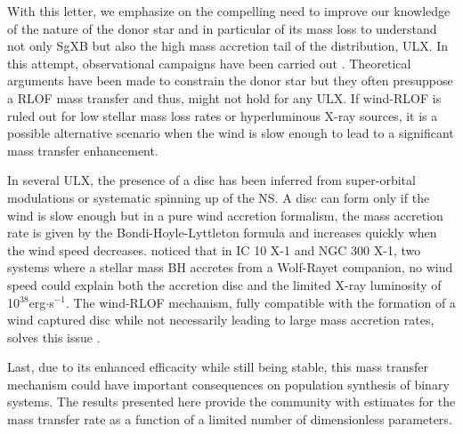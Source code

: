 \documentclass[letter]{aa}
\makeatletter
\newcommand{\sgx}{SgXB\xspace}
\newcommand{\ulx}{ULX\xspace}
\newcommand*{\rlof}{RLOF\@\xspace}
\newcommand*{\ns}{NS\@\xspace}
\newcommand*{\bh}{BH\@\xspace}
\newcommand*{\eg}{e.g.\@\xspace}
\newcommand*{\ie}{i.e.\@\xspace}
\makeatother
\begin{document}
With this letter, we emphasize on the compelling need to improve our knowledge of the nature of the donor star and in particular of its mass loss to understand not only \sgx but also the high mass accretion tail of the distribution, \ulx. In this attempt, observational campaigns have been carried out \cite[see \eg][]{Heida2014}. Theoretical arguments have been made to constrain the donor star but they often presuppose a \rlof mass transfer and thus, might not hold for any \ulx \citep{Karino2017}. If wind-\rlof is ruled out for low stellar mass loss rates or hyperluminous X-ray sources, it is a possible alternative scenario when the wind is slow enough to lead to a significant mass transfer enhancement. 

In several \ulx, the presence of a disc has been inferred from super-orbital modulations or systematic spinning up of the \ns \citep[\eg in P13,][]{Fuerst2018}. A disc can form only if the wind is slow enough \citep{Illarionov1975} but in a pure wind accretion formalism, the mass accretion rate is given by the Bondi-Hoyle-Lyttleton formula and increases quickly when the wind speed decreases. \cite{Tutukov2016} noticed that in IC 10 X-1 and NGC 300 X-1, two systems where a stellar mass \bh accretes from a Wolf-Rayet companion, no wind speed could explain both the accretion disc and the limited X-ray luminosity of 10$^{38}$erg$\cdot$s$^{-1}$. The wind-\rlof mechanism, fully compatible with the formation of a wind captured disc while not necessarily leading to large mass accretion rates, solves this issue \citep{ElMellah2018}. 

Last, due to its enhanced efficacity while still being stable, this mass transfer mechanism could have important consequences on population synthesis of binary systems. The results presented here provide the community with estimates for the mass transfer rate as a function of a limited number of dimensionless parameters.


\end{document}
